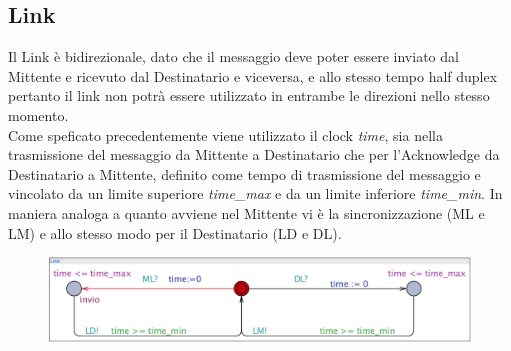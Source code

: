 \documentclass{article}
\begin{document}
\subsection{Link}
Il Link è bidirezionale, dato che il messaggio deve poter essere inviato dal Mittente e ricevuto dal Destinatario e viceversa, e allo stesso tempo half duplex pertanto il link non potrà essere utilizzato in entrambe le direzioni nello stesso momento.
\\Come speficato precedentemente viene utilizzato il clock \textit{time}, sia nella trasmissione del messaggio da Mittente a Destinatario che per l'Acknowledge da Destinatario a Mittente, definito come tempo di trasmissione del messaggio e vincolato da un limite superiore \textit{time\_max} e da un limite inferiore \textit{time\_min}. In maniera analoga a quanto avviene nel Mittente vi è la sincronizzazione (ML e LM) e allo stesso modo per il Destinatario (LD e DL).
\begin{figure}[h] 
\centering
\includegraphics[scale=0.35]{modelloAL.png}
\end{figure}
\end{document}
